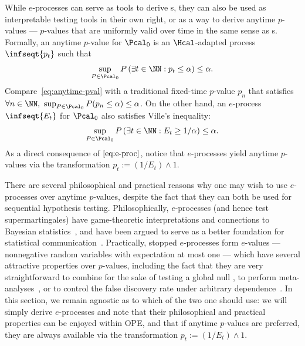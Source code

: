 While $e$-processes can serve as tools to derive \cs{}s, they can also be used as interpretable testing tools in their own right, or as a way to derive anytime $p$-values --- $p$-values that are uniformly valid over time in the same sense as \cs{}s. Formally, an anytime $p$-value for $\Pcal_0$ is an $\Hcal$-adapted process $\infseqt{p_t}$ such that
\begin{equation}\label{eq:anytime-pval}
  \sup_{P \in \Pcal_0} P \left ( \exists t \in \NN : p_t \leq \alpha \right ) \leq \alpha.
\end{equation}
Compare~\eqref{eq:anytime-pval} with a traditional fixed-time $p$-value $p_n$ that satisfies $\forall n \in \NN,\ \sup_{P \in \Pcal_0} P(p_n \leq \alpha) \leq \alpha$. On the other hand, an $e$-process $\infseqt{E_t}$ for $\Pcal_0$ also satisfies Ville's inequality:
\begin{equation}\label{eq:e-proc}
  \sup_{P \in \Pcal_0} P \left ( \exists t \in \NN : E_t \geq 1/\alpha \right ) \leq \alpha.
\end{equation}
As a direct consequence of $\eqref{eq:e-proc}$, notice that $e$-processes yield anytime $p$-values via the transformation $p_t := (1/E_t) \land 1$.
\begin{remark}\label{remark:p-vs-e}
There are several philosophical and practical reasons why one may wish to use $e$-processes over anytime $p$-values, despite the fact that they can both be used for sequential hypothesis testing. Philosophically, $e$-processes (and hence test supermartingales) have game-theoretic interpretations and connections to Bayesian statistics~\citep{shafer2011test,grunwald2019safe,waudby2020confidence}, and have been argued to serve as a better foundation for statistical communication~\citep{shafer2021testing}. Practically, stopped $e$-processes form $e$-values --- nonnegative random variables with expectation at most one \citep{vovk2021values} --- which have several attractive properties over $p$-values, including the fact that they are very straightforward to combine for the sake of testing a global null \citep{vovk2021values}, to perform meta-analyses~\citep{ter2021all}, or to control the false discovery rate under arbitrary dependence~\citep{wang2020false}. In this section, we remain agnostic as to which of the two one should use: we will simply derive $e$-processes and note that their philosophical and practical properties can be enjoyed within OPE, and that if anytime $p$-values are preferred, they are always available via the transformation $p_t := (1/E_t) \land 1$.
\end{remark}
